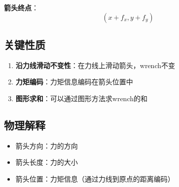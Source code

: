 \documentclass[12pt,a4paper]{article}
\begin{document}
\textbf{箭头终点}：
\begin{equation}
(x + f_x, y + f_y)
\end{equation}

\subsection{关键性质}

\begin{enumerate}
\item \textbf{沿力线滑动不变性}：在力线上滑动箭头，wrench不变
\item \textbf{力矩编码}：力矩信息编码在箭头位置中
\item \textbf{图形求和}：可以通过图形方法求wrench的和
\end{enumerate}

\subsection{物理解释}

\begin{itemize}
\item 箭头方向：力的方向
\item 箭头长度：力的大小
\item 箭头位置：力矩信息（通过力线到原点的距离编码）
\end{itemize}
\end{document}
